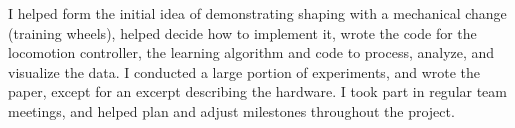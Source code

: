 I helped form the initial idea of demonstrating shaping with a mechanical change (training wheels), helped decide how to implement it, wrote the code for the locomotion controller, the learning algorithm and code to process, analyze, and visualize the data. I conducted a large portion of experiments, and wrote the paper, except for an excerpt describing the hardware. I took part in regular team meetings, and helped plan and adjust milestones throughout the project. \\


